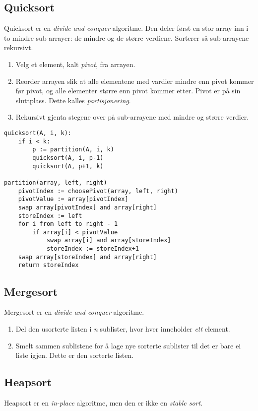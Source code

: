 \documentclass[11pt,a4paper]{article}
\theoremstyle{def}
\begin{document}
\subsection{Quicksort}
Quicksort er en \textit{divide and conquer} algoritme. Den deler først en stor array inn i to mindre sub-arrayer: de mindre og de større verdiene. Sorterer så sub-arrayene rekursivt.

\begin{enumerate}
\item
Velg et element, kalt \textit{pivot}, fra arrayen.
\item
Reorder arrayen slik at alle elementene med vardier mindre enn pivot kommer før pivot, og alle elementer større enn pivot kommer etter. Pivot er på sin sluttplass. Dette kalles \textit{partisjonering}.
\item
Rekursivt gjenta stegene over på sub-arrayene med mindre og større verdier.
\end{enumerate}

\begin{Verbatim}[frame=single]
quicksort(A, i, k):
    if i < k:
        p := partition(A, i, k)
        quicksort(A, i, p-1)
        quicksort(A, p+1, k)

partition(array, left, right)
    pivotIndex := choosePivot(array, left, right)
    pivotValue := array[pivotIndex]
    swap array[pivotIndex] and array[right]
    storeIndex := left
    for i from left to right - 1
        if array[i] < pivotValue
            swap array[i] and array[storeIndex]
            storeIndex := storeIndex+1
    swap array[storeIndex] and array[right]
    return storeIndex
\end{Verbatim}

\subsection{Mergesort}
Mergesort er en \textit{divide and conquer} algoritme.
\begin{enumerate}
\item
Del den usorterte listen i \textit{n} sublister, hvor hver inneholder \textit{ett} element.
\item
Smelt sammen sublistene for å lage nye sorterte sublister til det er bare ei liste igjen. Dette er den sorterte listen.
\end{enumerate}

\subsection{Heapsort}
Heapsort er en \textit{in-place} algoritme, men den er ikke en \textit{stable sort}.
\end{document}

